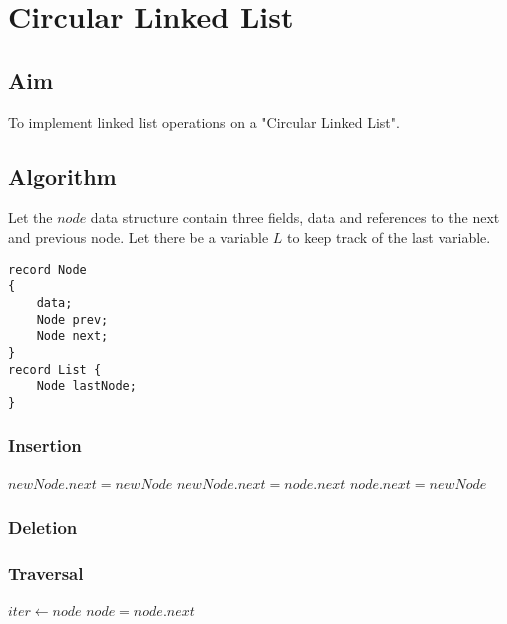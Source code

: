 \chapter{Circular Linked List}

\section{Aim}

To implement linked list operations on a "Circular Linked List".

\section{Algorithm}

Let the $node$ data structure contain three fields,
data and references to the next and previous node. Let there be a variable $L$ to keep track of the last variable.

\begin{lstlisting}[style=myC]
record Node
{
	data;
	Node prev;
	Node next;
}
record List {
	Node lastNode;
}

\end{lstlisting}

\subsection{Insertion}

\begin{algorithmic}
			\State $newNode.next = newNode$
		\Else
			\State $newNode.next = node.next$
			\State $node.next = newNode$
		\EndIf
	\EndFunction
\end{algorithmic}

\subsection{Deletion}

\subsection{Traversal}

\begin{algorithmic}
			\State $iter \gets node$
			\Repeat
				\State {}
				\State $node = node.next$
		\EndIf
	\EndFunction
\end{algorithmic}


